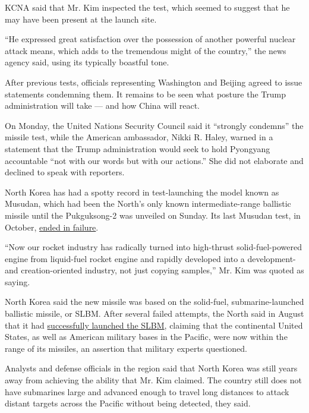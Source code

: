 KCNA said that Mr. Kim inspected the test, which seemed to suggest that
he may have been present at the launch site.

``He expressed great satisfaction over the possession of another
powerful nuclear attack means, which adds to the tremendous might of the
country,'' the news agency said, using its typically boastful tone.

After previous tests, officials representing Washington and Beijing
agreed to issue statements condemning them. It remains to be seen what
posture the Trump administration will take --- and how China will react.

On Monday, the United Nations Security Council said it ``strongly
condemns'' the missile test, while the American ambassador, Nikki R.
Haley, warned in a statement that the Trump administration would seek to
hold Pyongyang accountable ``not with our words but with our actions.''
She did not elaborate and declined to speak with reporters.

North Korea has had a spotty record in test-launching the model known as
Musudan, which had been the North's only known intermediate-range
ballistic missile until the Pukguksong-2 was unveiled on Sunday. Its
last Musudan test, in October,
\href{https://www.nytimes.com/2016/10/20/world/asia/north-korea-musudan-missile-failure.html}{ended
in failure}.

``Now our rocket industry has radically turned into high-thrust
solid-fuel-powered engine from liquid-fuel rocket engine and rapidly
developed into a development- and creation-oriented industry, not just
copying samples,'' Mr. Kim was quoted as saying.

North Korea said the new missile was based on the solid-fuel,
submarine-launched ballistic missile, or SLBM. After several failed
attempts, the North said in August that it had
\href{https://www.nytimes.com/2016/08/25/world/asia/north-korea-kim-jong-un-missile-test.html}{successfully
launched the SLBM}, claiming that the continental United States, as well
as American military bases in the Pacific, were now within the range of
its missiles, an assertion that military experts questioned.

Analysts and defense officials in the region said that North Korea was
still years away from achieving the ability that Mr. Kim claimed. The
country still does not have submarines large and advanced enough to
travel long distances to attack distant targets across the Pacific
without being detected, they said.

